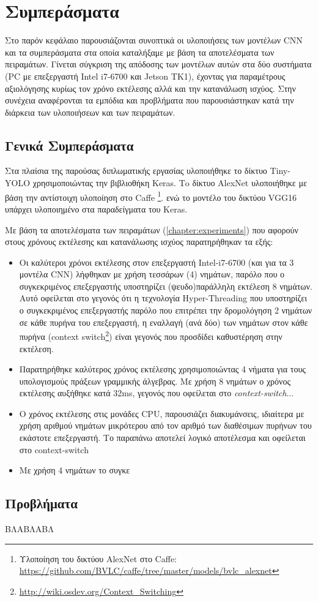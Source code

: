 \chapter{Συμπεράσματα}
\label{chapter:conclusions}

Στο παρόν κεφάλαιο παρουσιάζονται συνοπτικά οι υλοποιήσεις των μοντέλων CNN
και τα συμπεράσματα στα οποία καταλήξαμε με βάση τα αποτελέσματα των πειραμάτων.
Γίνεται σύγκριση της απόδοσης των μοντέλων αυτών στα δύο συστήματα
(PC με επεξεργαστή Intel i7-6700 και Jetson TK1), έχοντας για
παραμέτρους αξιολόγησης κυρίως τον χρόνο εκτέλεσης αλλά και την κατανάλωση ισχύος.
Στην συνέχεια αναφέρονται τα εμπόδια και προβλήματα που παρουσιάστηκαν
κατά την διάρκεια των υλοποιήσεων και των πειραμάτων.

\section{Γενικά Συμπεράσματα}

Στα πλαίσια της παρούσας διπλωματικής εργασίας υλοποιήθηκε το δίκτυο
Tiny-YOLO χρησιμοποιώντας την βιβλιοθήκη Keras.
Τo δίκτυο AlexNet υλοποιήθηκε με βάση την αντίστοιχη υλοποίηση
στο Caffe \footnote{Υλοποίηση του δικτύου AlexNet στο Caffe: \url{https://github.com/BVLC/caffe/tree/master/models/bvlc_alexnet}}.
ενώ το μοντέλο του δικτύου VGG16 υπάρχει υλοποιημένο στα παραδείγματα του Keras.

Με βάση τα αποτελέσματα των πειραμάτων (\autoref{chapter:experiments})
που αφορούν στους χρόνους εκτέλεσης και κατανάλωσης ισχύος παρατηρήθηκαν τα
εξής:
\begin{itemize}
  \item{Οι καλύτεροι χρόνοι εκτέλεσης στον επεξεργαστή Intel-i7-6700 (και για τα 3 μοντέλα CNN)
      λήφθηκαν με χρήση τεσσάρων (4) νημάτων, παρόλο που ο συγκεκριμένος επεξεργαστής υποστηρίζει
      (ψευδο)παράλληλη εκτέλεση 8 νημάτων. Αυτό οφείλεται στο γεγονός ότι
      η τεχνολογία Hyper-Threading που υποστηρίζει ο συγκεκριμένος επεξεργαστής
      παρόλο που επιτρέπει την δρομολόγηση 2
      νημάτων σε κάθε πυρήνα του επεξεργαστή, η εναλλαγή (ανά δύο) των
      νημάτων στον κάθε πυρήνα (context switch\footnote{\url{http://wiki.osdev.org/Context_Switching}})
      είναι γεγονός που προσδίδει καθυστέρηση στην εκτέλεση.}

  \item{Παρατηρήθηκε καλύτερος χρόνος εκτέλεσης χρησιμοποιώντας 4 νήματα
      για τους υπολογισμούς πράξεων γραμμικής άλγεβρας. Με χρήση
      8 νημάτων ο χρόνος εκτέλεσης αυξήθηκε κατά 32ms, γεγονός που οφείλεται
    στο \emph{context-switch}...}
  \item{Ο χρόνος εκτέλεσης στις μονάδες CPU, παρουσιάζει διακυμάνσεις,
      ιδιαίτερα με χρήση αριθμού νημάτων μικρότερου από τον αριθμό
      των διαθέσιμων πυρήνων του εκάστοτε επεξεργαστή.
    Το παραπάνω αποτελεί λογικό αποτέλεσμα και οφείλεται στο context-switch}
  \item{Με χρήση 4 νημάτων το συγκε}
\end{itemize}



\section{Προβλήματα}

ΒΛΑΒΛΑΒΛ
